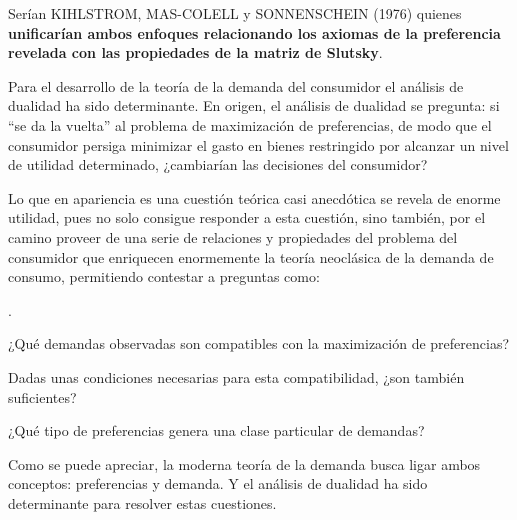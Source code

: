 \documentclass[10pt,a4paper]{article}
\newcounter{numitem}
\newenvironment{lnum}
      {\begin{list}{\arabic{numitem}.}{%
          \usecounter{numitem}%
          \setlength{\leftmargin}{1cm}%
          \setlength{\parskip}{3pt}%
          \setlength{\itemsep}{0pt}%
          \setlength{\parsep}{0pt}%
      }}
      {\end{list}}
\begin{document}
Serían KIHLSTROM, MAS-COLELL y SONNENSCHEIN (1976) quienes \textbf{unificarían ambos enfoques relacionando los axiomas de la preferencia revelada con las propiedades de la matriz de Slutsky}.

Para el desarrollo de la teoría de la demanda del consumidor el análisis de dualidad ha sido determinante. En origen, el análisis de dualidad se pregunta: si ``se da la vuelta'' al problema de maximización de preferencias, de modo que el consumidor persiga minimizar el gasto en bienes restringido por alcanzar un nivel de utilidad determinado, ¿cambiarían las decisiones del consumidor?

Lo que en apariencia es una cuestión teórica casi anecdótica se revela de enorme utilidad, pues no solo consigue responder a esta cuestión, sino también, por el camino proveer de una serie de relaciones y propiedades del problema del consumidor que enriquecen enormemente la teoría neoclásica de la demanda de consumo, permitiendo contestar a preguntas como:

\begin{lnum}
    \item ¿Qué demandas observadas son compatibles con la maximización de preferencias?
    \item Dadas unas condiciones necesarias para esta compatibilidad, ¿son también suficientes?
    \item ¿Qué tipo de preferencias genera una clase particular de demandas?
\end{lnum}

Como se puede apreciar, la moderna teoría de la demanda busca ligar ambos conceptos: preferencias y demanda. Y el análisis de dualidad ha sido determinante para resolver estas cuestiones.
\end{document}

